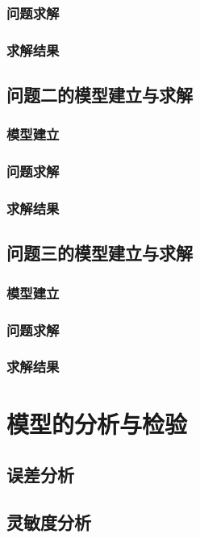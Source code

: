 \documentclass[withoutpreface,bwprint]{cumcmthesis} %
\begin{document}
\subsubsection{问题求解}
\subsubsection{求解结果}

\subsection{问题二的模型建立与求解}
\subsubsection{模型建立}
\subsubsection{问题求解}
\subsubsection{求解结果}

\subsection{问题三的模型建立与求解}
\subsubsection{模型建立}
\subsubsection{问题求解}
\subsubsection{求解结果}

\section{模型的分析与检验}
\subsection{误差分析}
\subsection{灵敏度分析}
\end{document}
